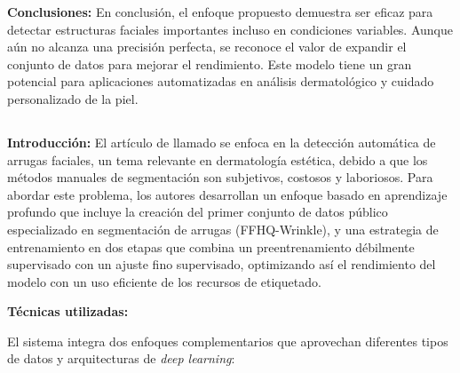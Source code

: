 \textbf{Conclusiones:}
En conclusión, el enfoque propuesto demuestra ser eficaz para detectar estructuras faciales importantes incluso en condiciones variables. Aunque aún no alcanza una precisión perfecta, se reconoce el valor de expandir el conjunto de datos para mejorar el rendimiento. Este modelo tiene un gran potencial para aplicaciones automatizadas en análisis dermatológico y cuidado personalizado de la piel.

\subsection{}

\textbf{Introducción:}
El artículo de \cite{moon2024dermatology} llamado  se enfoca en la detección automática de arrugas faciales, un tema relevante en dermatología estética, debido a que los métodos manuales de segmentación son subjetivos, costosos y laboriosos. Para abordar este problema, los autores desarrollan un enfoque basado en aprendizaje profundo que incluye la creación del primer conjunto de datos público especializado en segmentación de arrugas (FFHQ-Wrinkle), y una estrategia de entrenamiento en dos etapas que combina un preentrenamiento débilmente supervisado con un ajuste fino supervisado, optimizando así el rendimiento del modelo con un uso eficiente de los recursos de etiquetado.

\textbf{Técnicas utilizadas:}

El sistema integra dos enfoques complementarios que aprovechan diferentes tipos de datos y arquitecturas de \textit{deep learning}:


